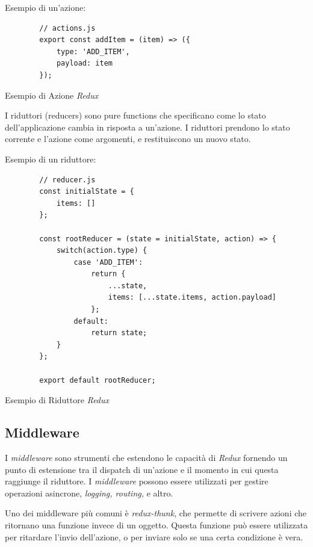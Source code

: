 Esempio di un'azione:
\begin{listing}[H]
    \begin{verbatim}
        // actions.js
        export const addItem = (item) => ({
            type: 'ADD_ITEM',
            payload: item
        });
    \end{verbatim}
    \caption{Esempio di Azione \textit{Redux}}
    \label{listing:azione}
\end{listing}

I riduttori (reducers) sono pure functions che specificano come lo stato dell'applicazione cambia in risposta a un'azione.
I riduttori prendono lo stato corrente e l'azione come argomenti, e restituiscono un nuovo stato.

Esempio di un riduttore:
\begin{listing}[H]
    \begin{verbatim}
        // reducer.js
        const initialState = {
            items: []
        };

        const rootReducer = (state = initialState, action) => {
            switch(action.type) {
                case 'ADD_ITEM':
                    return {
                        ...state,
                        items: [...state.items, action.payload]
                    };
                default:
                    return state;
            }
        };

        export default rootReducer;
    \end{verbatim}
    \caption{Esempio di Riduttore \textit{Redux}}
    \label{listing:riduttore}
\end{listing}

\subsection{Middleware}
\label{subsubsec:middleware}

I \textit{middleware} sono strumenti che estendono le capacità di \textit{Redux} fornendo un punto di estensione tra il dispatch di un'azione e il momento in cui questa raggiunge il riduttore.
I \textit{middleware} possono essere utilizzati per gestire operazioni asincrone, \textit{logging, routing,} e altro.

Uno dei middleware più comuni è \textit{redux-thunk}, che permette di scrivere azioni che ritornano una funzione invece di un oggetto.
Questa funzione può essere utilizzata per ritardare l'invio dell'azione, o per inviare solo se una certa condizione è vera.

